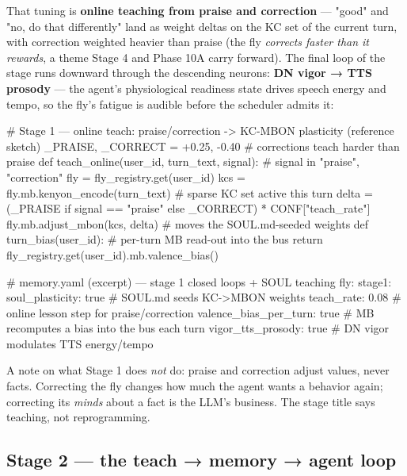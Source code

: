 \documentclass[11pt]{article}
\begin{document}
That tuning is \textbf{online teaching from praise and correction} — "good" and "no, do that differently" land as weight deltas on the KC set of the current turn, with correction weighted heavier than praise (the fly \emph{corrects faster than it rewards}, a theme Stage 4 and Phase 10A carry forward). The final loop of the stage runs downward through the descending neurons: \textbf{DN vigor → TTS prosody} — the agent's physiological readiness state drives speech energy and tempo, so the fly's fatigue is audible before the scheduler admits it:

\begin{CodeBlock}
# Stage 1 — online teach: praise/correction -> KC-MBON plasticity (reference sketch)
_PRAISE, _CORRECT = +0.25, -0.40          # corrections teach harder than praise
def teach_online(user_id, turn_text, signal):   # signal in {"praise", "correction"}
    fly = fly_registry.get(user_id)
    kcs = fly.mb.kenyon_encode(turn_text)       # sparse KC set active this turn
    delta = (_PRAISE if signal == "praise" else _CORRECT) * CONF["teach_rate"]
    fly.mb.adjust_mbon(kcs, delta)              # moves the SOUL.md-seeded weights
def turn_bias(user_id):                         # per-turn MB read-out into the bus
    return fly_registry.get(user_id).mb.valence_bias()
\end{CodeBlock}

\begin{CodeBlock}
# memory.yaml (excerpt) — stage 1 closed loops + SOUL teaching
fly:
  stage1:
    soul_plasticity: true         # SOUL.md seeds KC->MBON weights
    teach_rate: 0.08              # online lesson step for praise/correction
    valence_bias_per_turn: true   # MB recomputes a bias into the bus each turn
    vigor_tts_prosody: true       # DN vigor modulates TTS energy/tempo
\end{CodeBlock}

A note on what Stage 1 does \emph{not} do: praise and correction adjust values, never facts. Correcting the fly changes how much the agent wants a behavior again; correcting its \emph{minds} about a fact is the LLM's business. The stage title says teaching, not reprogramming.

\subsection{Stage 2 — the teach → memory → agent loop}
\end{document}
